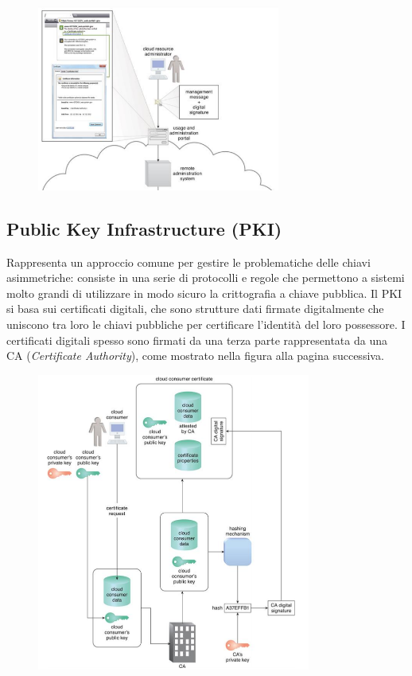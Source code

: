 \begin{figure}[htb!]
    \centering
    \includegraphics[width=8cm]{./Images/cap10/10.3.png}
\end{figure}


\subsection{Public Key Infrastructure (PKI)}
Rappresenta un approccio comune per gestire le problematiche delle chiavi asimmetriche: consiste in una serie di protocolli e regole che permettono a sistemi molto grandi di utilizzare in modo sicuro la crittografia a chiave pubblica. Il PKI si basa sui certificati digitali, che sono strutture dati firmate digitalmente che uniscono tra loro le chiavi pubbliche per certificare l'identità del loro possessore. I certificati digitali spesso sono firmati da una terza parte rappresentata da una CA (\textit{Certificate Authority}), come mostrato nella figura alla pagina successiva.

\begin{figure}[htb!]
    \centering
    \includegraphics[width=9cm]{./Images/cap10/10.4.png}
\end{figure}

